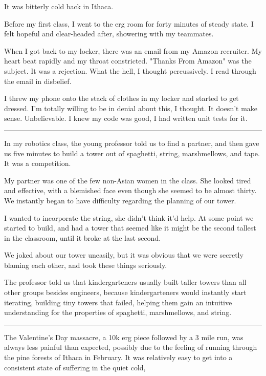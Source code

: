 It was bitterly cold back in Ithaca.

Before my first class, I went to the erg room for forty minutes of steady state.
I felt hopeful and clear-headed after, showering with my teammates.

When I got back to my locker, there was an email from my Amazon recruiter.  My
heart beat rapidly and my throat constricted.  "Thanks From Amazon" was the
subject.  It was a rejection.  What the hell, I thought percussively.  I read
through the email in disbelief.

I threw my phone onto the stack of clothes in my locker and started to get
dressed.  I'm totally willing to be in denial about this, I thought.  It doesn't
make sense.  Unbelievable.  I knew my code was good, I had written unit tests
for it.  

\plainfancybreak{12pt}{2}{* * *}

In my robotics class, the young professor told us to find a partner, and then
gave us five minutes to build a tower out of spaghetti, string, marshmellows,
and tape.  It was a competition.

My partner was one of the few non-Asian women in the class.  She looked tired
and effective, with a blemished face even though she seemed to be almost thirty.
We instantly began to have difficulty regarding the planning of our tower.  

I wanted to incorporate the string, she didn't think it'd help.  At some point
we started to build, and had a tower that seemed like it might be the second
tallest in the classroom, until it broke at the last second.

We joked about our tower uneasily, but it was obvious that we were secretly
blaming each other, and took these things seriously.

The professor told us that kindergarteners usually built taller towers than all
other groups besides engineers, because kindergarteners would instantly start
iterating, building tiny towers that failed, helping them gain an intuitive
understanding for the properties of spaghetti, marshmellows, and string. 

\plainfancybreak{12pt}{2}{* * *}

The Valentine's Day massacre, a 10k erg piece followed by a 3 mile run, was
always less painful than expected, possibly due to the feeling of running
through the pine forests of Ithaca in February.  It was relatively easy to get
into a consistent state of suffering in the quiet cold, 

